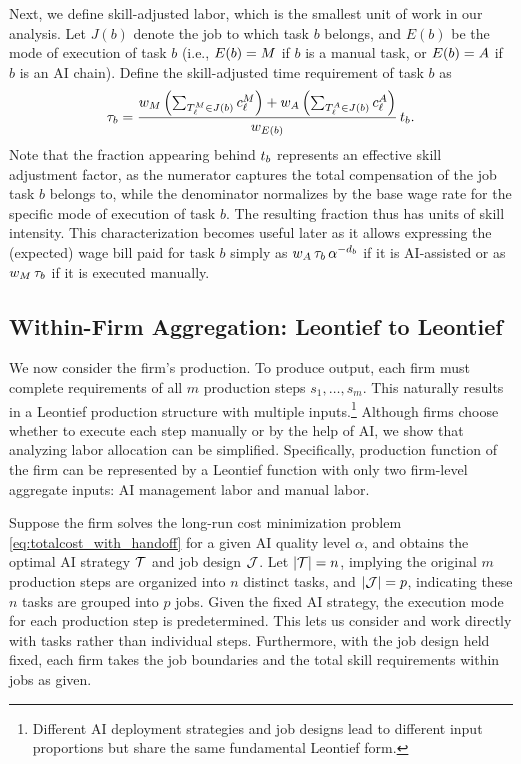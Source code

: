 Next, we define skill-adjusted labor, which is the smallest unit of work in our analysis.
Let $J(b)$ denote the job to which task $b$ belongs, and $E(b)$ be the mode of execution of task $b$ (i.e., $E(b) = M$ if $b$ is a manual task, or $E(b) = A$ if $b$ is an AI chain).
Define the skill-adjusted time requirement of task $b$ as
\[
\tau_b = \frac{w_{M} \left(\sum_{T_{\ell}^{M} \in J(b)} c^{M}_{\ell}\right) + w_{A} \left(\sum_{T_{\ell}^{A} \in J(b)} c^{A}_{\ell}\right)}{w_{E(b)}} \, t_{b}.\label{eq:skill_adjusted_time}
\]
Note that the fraction appearing behind $t_{b}$ represents an effective skill adjustment factor, as the numerator captures the total compensation of the job task $b$ belongs to, while the denominator normalizes by the base wage rate for the specific mode of execution of task $b$.
The resulting fraction thus has units of skill intensity.
This characterization becomes useful later as it allows expressing the (expected) wage bill paid for task $b$ simply as $w_{A}\,\tau_{b}\,\alpha^{-d_b}$ if it is AI-assisted or as $w_{M}\,\tau_{b}$ if it is executed manually.


\subsection{Within-Firm Aggregation: Leontief to Leontief}
\label{sec:agg_within}

We now consider the firm's production.
To produce output, each firm must complete requirements of all \( m \) production steps \( s_1, \ldots, s_m \).
This naturally results in a Leontief production structure with multiple inputs.\footnote{
Different AI deployment strategies and job designs lead to different input proportions but share the same fundamental Leontief form.
}
Although firms choose whether to execute each step manually or by the help of AI, we show that analyzing labor allocation can be simplified.
Specifically, production function of the firm can be represented by a Leontief function with only two firm-level aggregate inputs: AI management labor and manual labor.

Suppose the firm solves the long-run cost minimization problem \eqref{eq:totalcost_with_handoff} for a given AI quality level $\alpha$, and obtains the optimal AI strategy \( \mathcal{T} \) and job design \( \mathcal{J} \).
Let \( |\mathcal{T}| = n \), implying the original \( m \) production steps are organized into \( n \) distinct tasks, and \( |\mathcal{J}| = p \), indicating these \( n \) tasks are grouped into \( p \) jobs.
Given the fixed AI strategy, the execution mode for each production step is predetermined. 
This lets us consider and work directly with tasks rather than individual steps.
Furthermore, with the job design held fixed, each firm takes the job boundaries and the total skill requirements within jobs as given.


